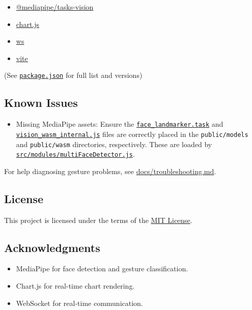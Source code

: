 \begin{itemize}
\tightlist
\item
  \href{https://www.npmjs.com/package/@mediapipe/tasks-vision}{@mediapipe/tasks-vision}
\item
  \href{https://www.chartjs.org/}{chart.js}
\item
  \href{https://github.com/websockets/ws}{ws}
\item
  \href{https://vitejs.dev/}{vite}
\end{itemize}

(See \href{package.json}{\texttt{package.json}} for full list and
versions)

\subsection{Known Issues}\label{known-issues}

\begin{itemize}
\tightlist
\item
  Missing MediaPipe assets: Ensure the
  \href{public/models/face_landmarker.task}{\texttt{face\_landmarker.task}}
  and
  \href{public/wasm/vision_wasm_internal.js}{\texttt{vision\_wasm\_internal.js}}
  files are correctly placed in the \texttt{public/models} and
  \texttt{public/wasm} directories, respectively. These are loaded by
  \href{src/modules/multiFaceDetector.js}{\texttt{src/modules/multiFaceDetector.js}}.
\end{itemize}

For help diagnosing gesture problems, see \url{docs/troubleshooting.md}.

\subsection{License}\label{license}

This project is licensed under the terms of the \href{LICENSE}{MIT
License}.

\subsection{Acknowledgments}\label{acknowledgments}

\begin{itemize}
\tightlist
\item
  MediaPipe for face detection and gesture classification.
\item
  Chart.js for real-time chart rendering.
\item
  WebSocket for real-time communication.
\end{itemize}
